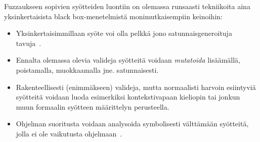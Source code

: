 Fuzzaukseen sopivien syötteiden luontiin on olemassa runsaasti tekniikoita aina yksinkertaisista black box-menetelmistä monimutkaisempiin keinoihin:
\begin{itemize}
    \item Yksinkertaisimmillaan syöte voi olla pelkkä jono satunnaisgeneroituja tavuja~\cite{UnixReliability}. \fixme[esimerkki]
    \item Ennalta olemassa olevia valideja syötteitä voidaan \emph{mutatoida} lisäämällä, poistamalla, muokkaamalla jne. satunnaisesti.
    \item Rakenteellisesti (enimmäkseen) valideja, mutta normaalisti harvoin esiintyviä syötteitä voidaan luoda esimerkiksi kontekstivapaan kieliopin tai jonkun muun formaalin syötteen määrittelyn perusteella.
    \item Ohjelman suoritusta voidaan analysoida symbolisesti välttämään syötteitä, jolla ei ole vaikutusta ohjelmaan~\cite{SageArtikkeli}.
\end{itemize}



